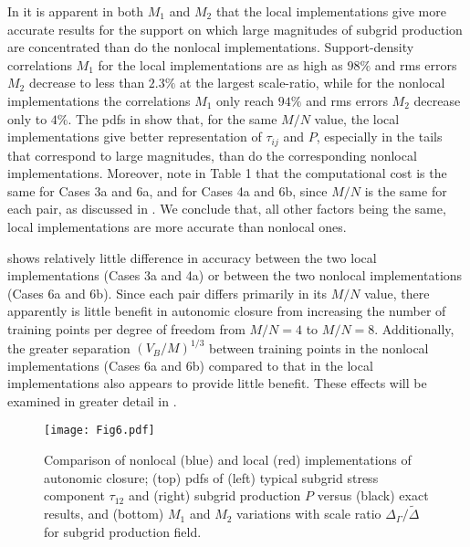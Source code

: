 In  it is apparent in both $M_1$  and $M_2$  that the local implementations give more accurate results for the support on which large magnitudes of subgrid production are concentrated than do the nonlocal implementations. Support-density correlations $M_1$ for the local implementations are as high as $98\%$ and rms errors $M_2$  decrease to less than $2.3\%$  at the largest scale-ratio, while for the nonlocal implementations the correlations $M_1$  only reach $94\%$ and rms errors $M_2$  decrease only to $4\%$. The pdfs in   show that, for the same $M/N$  value, the local implementations give better representation of  $\tau_{ij}$ and $P$, especially in the tails that correspond to large magnitudes, than do the corresponding nonlocal implementations. Moreover, note in Table 1 that the computational cost is the same for Cases 3a and 6a, and for Cases 4a and 6b, since  $M/N$ is the same for each pair, as discussed in . We conclude that, all other factors being the same, local implementations are more accurate than nonlocal ones. 

 shows relatively little difference in accuracy between the two local implementations (Cases 3a and 4a) or between the two nonlocal implementations (Cases 6a and 6b). Since each pair differs primarily in its  $M/N$ value, there apparently is little benefit in autonomic closure from increasing the number of training points per degree of freedom from  $M/N = 4$ to  $M/N = 8$. Additionally, the greater separation  $(V_B/M)^{1/3}$ between training points in the nonlocal implementations (Cases 6a and 6b) compared to that in the local implementations also appears to provide little benefit. These effects will be examined in greater detail in .

%
\begin{figure}
	\begin{center}
	\texttt{[image: Fig6.pdf]}
	\caption{ Comparison of nonlocal (blue) and local (red) implementations of autonomic closure; (top) pdfs of (left) typical subgrid stress component $\tau_{12}$ and (right) subgrid production $P$ versus (black) exact results, and (bottom) $M_1$ and $M_2$ variations with scale ratio $\Delta_{\Gamma}/\widetilde{\Delta}$ for subgrid production field. }
	\label{F:6}
	\end{center}
\end{figure}
%
%

